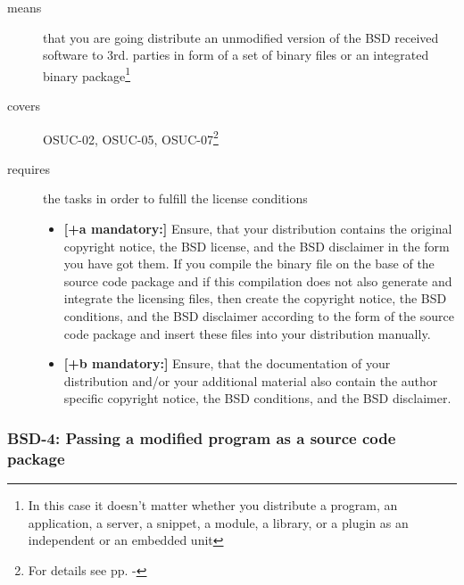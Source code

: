 \begin{description}
\item[means] that you are going distribute an unmodified version of the BSD
received software to 3rd. parties in form of a set of binary files or an
integrated binary package\footnote{In this case it doesn't matter whether you 
distribute a program, an application, a server, a snippet, a module, a library,
or a plugin as an independent or an embedded unit}
\item[covers] OSUC-02, OSUC-05, OSUC-07\footnote{For details see pp.
\pageref{OSUC-02-DEF} - \pageref{OSUC-07-DEF}}
\item[requires] the tasks in order to fulfill the license conditions
\begin{itemize}
  \item  \textbf{[+a mandatory:]} Ensure, that your distribution contains the
  original copyright notice, the BSD license, and the BSD disclaimer in the form
  you have got them. If you compile the binary file on the base of the source
  code package and if this compilation does not also generate and integrate the
  licensing files, then create the copyright notice, the BSD conditions, and the
  BSD disclaimer according to the form of the source code package and insert
  these files into your distribution manually.
  \item  \textbf{[+b mandatory:]} Ensure, that the documentation of your
  distribution and/or your additional material also contain the author specific
  copyright notice, the BSD conditions, and the BSD disclaimer.
\end{itemize}
\end{description}

\subsubsection{BSD-4: Passing a modified program as a source code package}
\label{OSUC-04-BSD}

